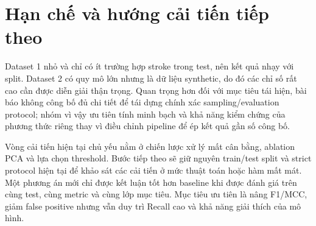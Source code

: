 \section{Hạn chế và hướng cải tiến tiếp theo}

Dataset 1 nhỏ và chỉ có ít trường hợp stroke trong test, nên kết quả nhạy với split. Dataset 2 có quy mô lớn nhưng là dữ liệu synthetic, do đó các chỉ số rất cao cần được diễn giải thận trọng. Quan trọng hơn đối với mục tiêu tái hiện, bài báo không công bố đủ chi tiết để tái dựng chính xác sampling/evaluation protocol; nhóm vì vậy ưu tiên tính minh bạch và khả năng kiểm chứng của phương thức riêng thay vì điều chỉnh pipeline để ép kết quả gần số công bố.

Vòng cải tiến hiện tại chủ yếu nằm ở chiến lược xử lý mất cân bằng, ablation PCA và lựa chọn threshold. Bước tiếp theo sẽ giữ nguyên train/test split và strict protocol hiện tại để khảo sát các cải tiến ở mức thuật toán hoặc hàm mất mát. Một phương án mới chỉ được kết luận tốt hơn baseline khi được đánh giá trên cùng test, cùng metric và cùng lớp mục tiêu. Mục tiêu ưu tiên là nâng F1/MCC, giảm false positive nhưng vẫn duy trì Recall cao và khả năng giải thích của mô hình.
